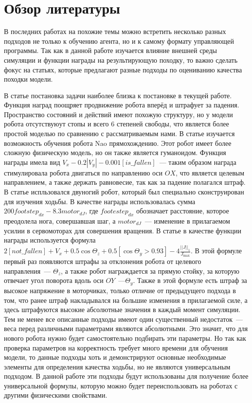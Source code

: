 \chapter{Обзор литературы}\label{ch:ch2}
В последних работах на похожие темы можно встретить несколько разных подходов не только к обучению агента, но и к самому формату управляющей программы. Так как в данной работе изучается влияние внешней среды симуляции и функции награды на результирующую походку, то важно сделать фокус на статьях, которые предлагают разные подходы по оцениванию качества походки модели.

В статье \cite{kumar2018bipedal} постановка задачи наиболее близка к постановке в текущей работе. Функция наград поощряет продвижение робота вперёд и штрафует за падения. Пространство состояний и действий имеют похожую структуру, но у модели робота отсутствуюут стопы и всего 6 степеней свободы, что является более простой моделью по сравнению с рассматриваемым нами. В статье \cite{8733632} изучается возможность обучения робота Nao прямохождению. Этот робот имеет более сложную физическую модель, но он также является гуманоидом. Функция награды имела вид $V_x - 0.2|V_y|-0.001[is\_fallen]$~--- таким образом награда стимулировала робота двигаться по направлению оси $OX$, что является целевым направлением, а также держать равновесие, так как за падение полагался штраф. В статье \cite{1573573} испльзовался двуногий робот, который был специально сконструирован для изучения ходьбы. В качестве награды использовалась сумма $200 footstep_{dx} - 8.3 motor_{dJ}$, где $footestep_{dx}$ обозначает расстояние, которое преодолела нога, совершавшая шаг, а $motor_{dJ}$~--- изменение в прилагаемом усилии в сервомоторах для совершения вращения. В статье \cite{liang2018gpuaccelerated} в качестве функции награды используется формула $2[not\_fallen]+V_x+0.5\cos{\Theta_z} + 0.5[\cos{\Theta_y > 0.93}] - 4\frac{||J||_1}{J_{\max}}$. В этой формуле первый раз появляются штрафы за отклонения робота от целевого направления~--- $\Theta_z$, а также робот награждается за прямую стойку, за которую отвечает угол поворота вдоль оси $OY$~---$\Theta_y$. Также в этой формуле есть штраф за высокое напряжение в моторчиках, только отличие от предыдущего подхода в том, что ранее штраф накладывался на большие изменения в прилагаемой силе, а здесь штрафуются высокие абсолютные значения в каждый момент симуляции. Тем не менее все описанные подходы имеют один существенный недостаток~--- веса перед различными параметрами являются абсолютными. Это значит, что для нового робота нужно будет самостоятельно подбирать эти параметры. Но так как проверка параметров на корректность требует много времени для обучения модели, то данные подходы хоть и демонстрируют основные необходимые элементы для определения качества ходьбы, но не являются универсальным подходом. В данной работе эти подходы будут использованы для получение более универсальной формулы, которую можно будет переиспользовать на роботах с другими физическими свойствами.

